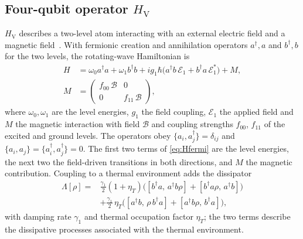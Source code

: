 \documentclass[conference]{IEEEtran}
\newcommand{\cE}{\mathcal{E}}
\newcommand{\HV}{H_{\mathrm{V}}}
\begin{document}
\subsection{Four-qubit operator \texorpdfstring{$\HV$}{HV}}\label{sec:hv}
$\HV$ describes a two-level atom interacting with an external electric field and a magnetic field~\cite{patel2026,patel2025}. With fermionic creation and annihilation operators $a^\dagger,a$ and $b^\dagger,b$ for the two levels, the rotating-wave Hamiltonian is
\begin{equation}
\begin{aligned}
H&=\omega_0 a^\dagger a+\omega_1 b^\dagger b+i g_1\hbar\big(a^\dagger b\,\cE_1+b^\dagger a\,\cE_1^{*}\big)+M,\\
M&=\begin{pmatrix}f_{00}\,\mathcal B&0\\0&f_{11}\,\mathcal B\end{pmatrix},
\end{aligned}
\label{eq:Hfermi}
\end{equation}
where $\omega_0,\omega_1$ are the level energies, $g_1$ the field coupling, $\cE_1$ the applied field and $M$ the magnetic interaction with field $\mathcal B$ and coupling strengths $f_{00}$, $f_{11}$ of the excited and ground levels. The operators obey $\{a_i,a_j^\dagger\}=\delta_{ij}$ and $\{a_i,a_j\}=\{a_i^\dagger,a_j^\dagger\}=0$. The first two terms of \eqref{eq:Hfermi} are the level energies, the next two the field-driven transitions in both directions, and $M$ the magnetic contribution. Coupling to a thermal environment adds the dissipator
\begin{equation}
\begin{aligned}
\Lambda[\rho]={}&\tfrac{\gamma_1}{2}(1+\eta_T)\big([b^\dagger a,\,a^\dagger b\rho]+[b^\dagger a\rho,\,a^\dagger b]\big)\\
&+\tfrac{\gamma_1}{2}\,\eta_T\big([a^\dagger b,\,\rho\, b^\dagger a]+[a^\dagger b\rho,\,b^\dagger a]\big),
\end{aligned}
\label{eq:dissT}
\end{equation}
with damping rate $\gamma_1$ and thermal occupation factor $\eta_T$; the two terms describe the dissipative processes associated with the thermal environment.
\end{document}
